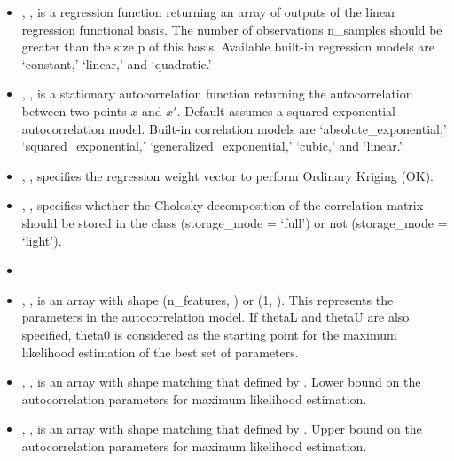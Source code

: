 
\begin{itemize}
  \item {}, , is a regression
  function returning an array of outputs of the linear regression functional
  basis.
  The number of observations n\_samples should be greater than the size p of
  this basis.
  Available built-in regression models are `constant,' `linear,' and 
  `quadratic.'
  \item {}, , is a stationary
  autocorrelation function returning the autocorrelation between two points $x$
  and $x'$.
  Default assumes a squared-exponential autocorrelation model.
  Built-in correlation models are `absolute\_exponential,' 
  `squared\_exponential,' `generalized\_exponential,' `cubic,' and `linear.'
  \item {}, , specifies
  the regression weight vector to perform Ordinary Kriging (OK).
  \item {}, , specifies
  whether the Cholesky decomposition of the correlation matrix should be stored
  in the class (storage\_mode = `full') or not (storage\_mode = `light').
  \item {}
  \item {}, , is an
  array with shape (n\_features, ) or (1, ).
  This represents the parameters in the autocorrelation model.
  If thetaL and thetaU are also specified, theta0 is considered as the starting
  point for the maximum likelihood estimation of the best set of parameters.
  \item {}, , is an
  array with shape matching that defined by .
  Lower bound on the autocorrelation parameters for maximum likelihood
  estimation.
  \item {}, , is an
  array with shape matching that defined by .
  Upper bound on the autocorrelation parameters for maximum likelihood
  estimation.

\end{itemize}
